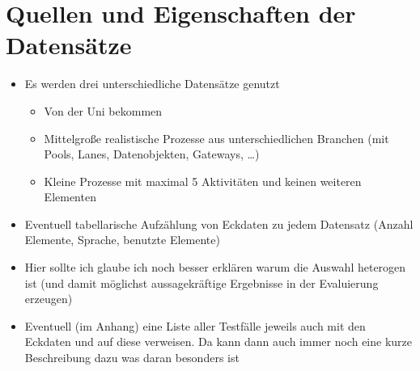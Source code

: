 \section{Quellen und Eigenschaften der Datensätze}\label{sec:quellen-und-eigenschaften-der-datensatze}

\begin{itemize}
    \item Es werden drei unterschiedliche Datensätze genutzt
    \begin{itemize}
        \item Von der Uni bekommen
        \item Mittelgroße realistische Prozesse aus unterschiedlichen Branchen (mit Pools, Lanes, Datenobjekten, Gateways, \ldots)
        \item Kleine Prozesse mit maximal 5 Aktivitäten und keinen weiteren Elementen
    \end{itemize}
    \item Eventuell tabellarische Aufzählung von Eckdaten zu jedem Datensatz (Anzahl Elemente, Sprache, benutzte Elemente)
    \item Hier sollte ich glaube ich noch besser erklären warum die Auswahl heterogen ist (und damit möglichst aussagekräftige Ergebnisse in der Evaluierung erzeugen)
    \item Eventuell (im Anhang) eine Liste aller Testfälle jeweils auch mit den Eckdaten und auf diese verweisen. Da kann dann auch immer noch eine kurze Beschreibung dazu was daran besonders ist
\end{itemize}